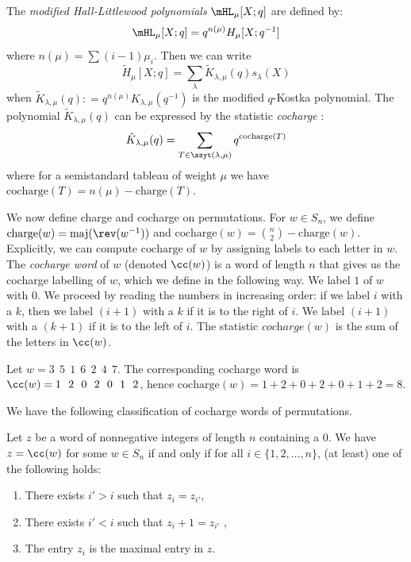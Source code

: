 The \textit{modified Hall-Littlewood polynomials} $\mHL_\mu [X;q]$ are defined by:
\[\mHL_\mu [X;q] = q^{n(\mu)} H_\mu[X;q^{-1}]\]
where $n(\mu) = \sum (i-1)\mu_i$.
Then we can write
\[ \tilde{H}_{\mu}[X;q] = \sum\limits_{\lambda}  \tilde{K}_{\lambda,\mu}(q) s_\lambda(X)\] when $\tilde{K}_{\lambda,\mu}(q): = q^{n(\mu)} K_{\lambda,\mu}(q^{-1})$ is the modified $q$-Kostka polynomial.
The polynomial $\tilde{K}_{\lambda,\mu}(q)$ can be expressed by the statistic \textit{cocharge} :\[\tilde{K}_{\lambda,\mu}(q) = \sum\limits_{T\in \ssyt(\lambda,\mu)}  q^{\text{cocharge}(T)}\]
where for a semistandard tableau of weight $\mu$ we have $\text{cocharge}(T) = n(\mu) - \text{charge}(T).$

We now define charge and cocharge on permutations.
For $w\in S_n$, we define $\text{charge}(w) = \text{maj}(\rev(w^{-1}))$ and $\text{cocharge}(w) = \binom{n}{2} - \text{charge}(w).$
Explicitly, we can compute $\text{cocharge}$ of $w$ by assigning labels to each letter in $w$.
The \textit{cocharge word} of $w$ (denoted $\cc(w)$) is a word of length $n$ that gives us the cocharge labelling of $w$, which we define in the following way. 
We label $1$ of $w$ with 0. We proceed by reading the numbers in increasing order: if we label $i$ with a $k$, then we label $(i+1)$ with a $k$ if it is to the right of $i$. We label $(i+1)$ with a $(k+1)$ if it is to the left of $i$.
The statistic $\textit{cocharge}(w)$  is the sum of the letters in $\cc(w)$. 

\begin{ex}\label{ex: cocharge word}
 Let $w = 3 \ \ 5 \ \ 1 \ \ 6\ \ 2 \ \ 4 \ \ 7 .$  
The corresponding cocharge word is $\cc(w)  = 1  \ \ 2 \ \ 0 \ \ 2 \ \ 0 \ \ 1 \ \ 2$, hence $\text{cocharge}(w) = 1 + 2 + 0 + 2 + 0 + 1 + 2 = 8.$
\end{ex}

We have the following classification of cocharge words of permutations.

\begin{prop}\label{prop: classification of cocharge words}
        Let $z$ be a word of nonnegative integers of length $n$ containing a 0.
        We have $z = \cc(w)$ for some $w\in S_n$ if and only if for all $i\in \{1,2,\dots,  n\}$, (at least) one of the following holds:
    \begin{enumerate}
        \item There exists $i'>i $ such that  $z_i =  z_{i'}$,
        \item There exists $i'<i $ such that  $z_i  + 1=  z_{i'}$ ,
         \item The entry $z_i$ is the maximal entry in $z$.
    \end{enumerate}

\end{prop}

